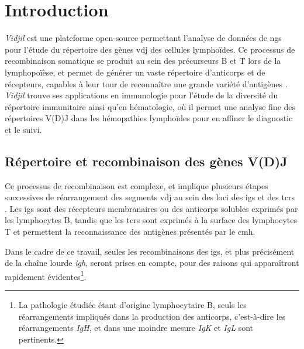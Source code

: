 \chapter{Introduction}

\textit{Vidjil} est une plateforme open-source
\cite{giraudFastMulticlonalClusterization2014b} permettant l'analyse de données
de \gls{ngs} pour l'étude du répertoire des gènes \gls{vdj} des cellules
lymphoïdes. Ce processus de recombinaison somatique se produit au sein des
précurseurs B et T lors de la lymphopoïèse, et permet de générer un vaste
répertoire d'anticorps et de récepteurs, capables à leur tour de reconnaître une
grande variété d'antigènes \cite{jonesTamingTransposonVDJ2004}. \textit{Vidjil}
trouve ses applications en immunologie pour l'étude de la diversité du
répertoire immunitaire ainsi qu'en hématologie, où il permet une analyse fine
des répertoires V(D)J dans les hémopathies lymphoïdes pour en affiner le
diagnostic et le suivi.

\section{Répertoire et recombinaison des gènes V(D)J}


Ce processus de recombinaison est complexe, et implique plusieurs étapes successives de réarrangement des segments \gls{vdj} 
au sein des loci des \glspl{ig} et des \glspl{tcr} \cite{rothVDJRecombinationMechanism2014}. Les \glspl{ig} sont des récepteurs membranaires 
ou des anticorps solubles exprimés par les lymphocytes B, tandis que les \glspl{tcr} sont exprimés à la surface des lymphocytes T et permettent 
la reconnaissance des antigènes présentés par le \gls{cmh}.

\vspace{1em}

Dans le cadre de ce travail, seules les recombinaisons des \glspl{ig}, et plus
précisément de la chaîne lourde \textit{\gls{igh}}, seront prises en compte,
pour des raisons qui apparaîtront rapidement évidentes\footnote{La pathologie
étudiée étant d'origine lymphocytaire B, seuls les réarrangements impliqués dans
la production des anticorps, c'est-à-dire les réarrangements \textit{IgH}, et
dans une moindre mesure \textit{IgK} et \textit{IgL} sont pertinents.}.

